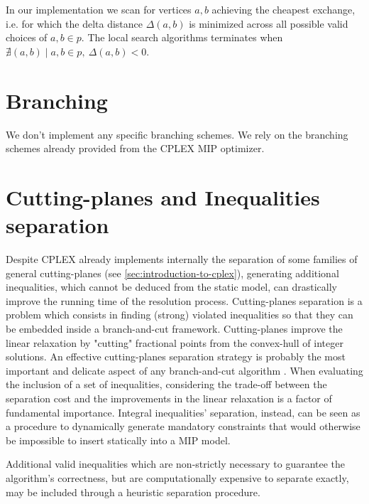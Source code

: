 In our implementation
we scan for vertices $a, b$ achieving the cheapest exchange,
i.e. for which the delta distance $\Delta(a, b)$ is minimized across all possible valid choices of $a, b \in p$.
The local search algorithms terminates when $\nexists (a, b) \mid a, b \in p,\ \Delta(a, b) < 0$.

\section{Branching}
\label{sec:impl-branching}


We don't implement any specific branching schemes.
We rely on the branching schemes already provided from the CPLEX MIP optimizer.

\section{Cutting-planes and Inequalities separation}
\label{sec:impl-separation-techniques}

Despite CPLEX already implements internally
the separation of some families of general cutting-planes
(see \cref{sec:introduction-to-cplex}),
generating additional inequalities,
which cannot be deduced from the static model,
can drastically improve the running time of the resolution process.
Cutting-planes separation is a problem which consists
in finding (strong) violated inequalities
so that they can be embedded inside a branch-and-cut framework.
Cutting-planes improve the linear relaxation
by "cutting" fractional points from the convex-hull of integer solutions.
An effective cutting-planes separation strategy
is probably the most important and delicate aspect of any branch-and-cut algorithm \parencite{ralphs2003}.
When evaluating the inclusion of a set of inequalities,
considering the trade-off between the separation cost
and the improvements in the linear relaxation
is a factor of fundamental importance.
Integral inequalities' separation, instead, can be seen as a procedure
to dynamically generate mandatory constraints
that would otherwise be impossible to insert statically into a MIP model.

Additional valid inequalities which are non-strictly necessary to guarantee the algorithm's correctness,
but are computationally expensive to separate exactly,
may be included through a heuristic separation procedure.

